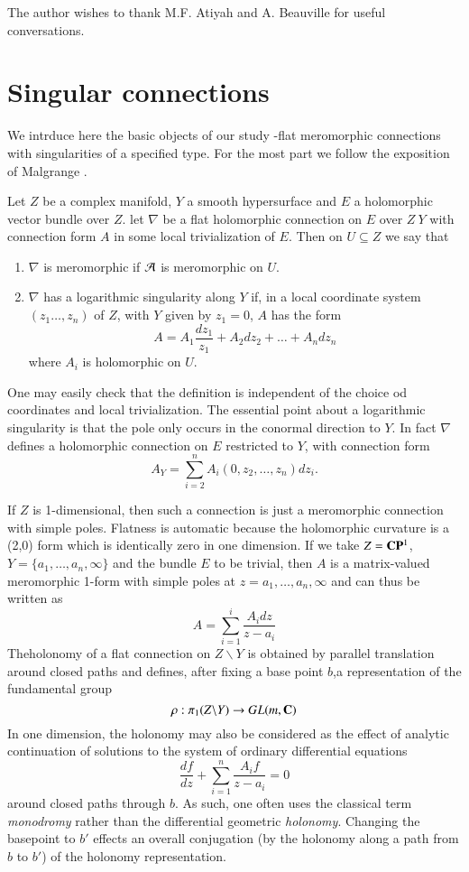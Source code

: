 The author wishes to thank M.F. Atiyah and A. Beauville for useful conversations.

\section{Singular connections}\label{art7-sec-2}  
We intrduce here the basic objects of our study -flat meromorphic connections with singularities of a specified type. For the most part we follow the exposition of Malgrange \cite{art7-key10}.

\begin{defn}\label{art7-definition-1}
Let $Z$ be a complex manifold, $Y$ a smooth hypersurface and $E$ a holomorphic vector bundle over $Z$. let $\nabla$ be a flat holomorphic connection on $E$ over $Z \ Y$ with connection form $A$ in some local trivialization of $E$. Then on $U\subseteq Z$ we say that
\begin{enumerate}[(1)]
\item $\nabla$ is meromorphic if $\mathcal{A}$ is meromorphic on $U$.

\item $\nabla$ has a logarithmic singularity along $Y$ if, in a local coordinate system $(z_{1}\ldots, z_{n})$ of $Z$, with $Y$ given by $z_{1} = 0$, $A$ has the form
$$
A = A_{1}\dfrac{dz_{1}}{z_{1}} + A_{2}dz_{2} + \ldots + A_{n}dz_{n}
$$
where $A_{i}$ is holomorphic on $U$.
\end{enumerate}
\end{defn}

One may easily check that the definition is independent of the choice od coordinates and local trivialization. The essential point about a logarithmic singularity is that the pole only occurs in the conormal direction to $Y$. In fact $\nabla$ defines a holomorphic connection on $E$ restricted to $Y$, with connection form
$$
A_{Y} = \sum\limits_{i=2}^{n}A_{i}(0, z_{2}, \ldots, z_{n})dz_{i}.
$$

If $Z$ is 1-dimensional, then such a connection is just a meromorphic connection with simple poles. Flatness is automatic because the holomorphic curvature is a (2,0) form which is identically zero in one dimension. If we take $Z=\mathbf{C}\mathbf{P}^{1}$, $Y = \{a_{1}, \ldots, a_{n}, \infty\}$ and the bundle $E$ to be trivial, then $A$ is a matrix-valued meromorphic 1-form with simple poles at $z=a_{1},\ldots, a_{n}, \infty$ and can thus be written as
$$
A = \sum\limits_{i =1}^{i}\dfrac{A_{i}dz}{z-a_{i}}
$$
The\pageoriginale holonomy of a flat connection on $Z\backslash Y$ is obtained by parallel translation around closed paths and defines, after fixing a base point $b$,a representation of the fundamental group
$$
\rho : \pi_{1}(Z\backslash Y) \rightarrow GL(m ,\mathbf{C})
$$
In one dimension, the holonomy may also be considered as the effect of analytic continuation of solutions to the system of ordinary differential equations
$$
\dfrac{df}{dz} + \sum\limits_{i=1}^{n} \dfrac{A_{i}f}{z-a_{i}} = 0
$$
around closed paths through $b$. As such, one often uses the classical term \textit{monodromy} rather than the differential geometric \textit{holonomy}. Changing the basepoint to $b'$ effects an overall conjugation (by the holonomy along a path from $b$ to $b'$) of the holonomy representation.

